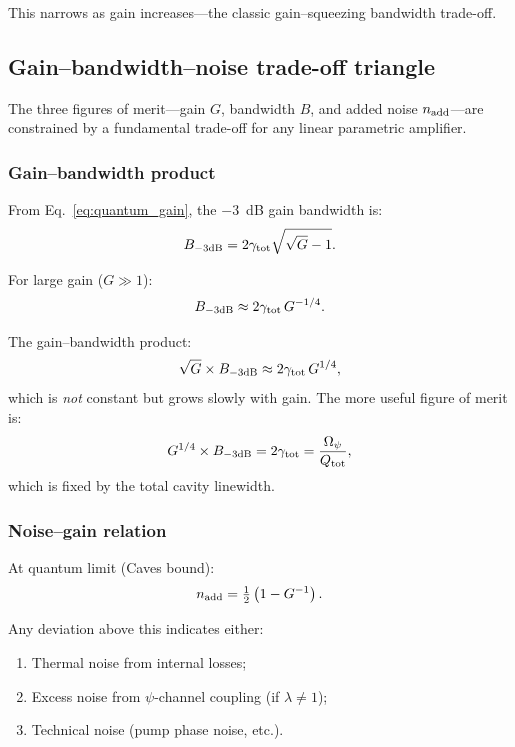 \documentclass[12pt,aps,prd,twocolumn,superscriptaddress,nofootinbib]{revtex4-2}
\newcommand{\Opsi}{\Omega_\psi}
\newcommand{\half}{\tfrac{1}{2}}
\begin{document}
This narrows as gain increases---the classic gain--squeezing
bandwidth trade-off.

\subsection{Gain--bandwidth--noise trade-off triangle}
\label{sec:triangle}

The three figures of merit---gain $G$, bandwidth $B$, and
added noise $n_{\rm add}$---are constrained by a fundamental
trade-off for any linear parametric amplifier.

\subsubsection{Gain--bandwidth product}

From Eq.~\eqref{eq:quantum_gain}, the $-3$~dB gain bandwidth is:
\begin{equation}
B_{-3{\rm dB}} = 2\gamma_{\rm tot}\sqrt{\sqrt{G}-1}.
\label{eq:gbw_exact}
\end{equation}

For large gain ($G \gg 1$):
\begin{equation}
B_{-3{\rm dB}} \approx 2\gamma_{\rm tot}\,G^{-1/4}.
\label{eq:gbw_approx}
\end{equation}

The gain--bandwidth product:
\begin{equation}
\sqrt{G}\times B_{-3{\rm dB}} \approx 2\gamma_{\rm tot}\,G^{1/4},
\label{eq:GBW}
\end{equation}
which is \emph{not} constant but grows slowly with gain.
The more useful figure of merit is:
\begin{equation}
G^{1/4}\times B_{-3{\rm dB}} = 2\gamma_{\rm tot}
= \frac{\Opsi}{Q_{\rm tot}},
\label{eq:GBW_const}
\end{equation}
which is fixed by the total cavity linewidth.

\subsubsection{Noise--gain relation}

At quantum limit (Caves bound):
\begin{equation}
n_{\rm add} = \half\left(1-G^{-1}\right).
\label{eq:noise_gain}
\end{equation}

Any deviation above this indicates either:
\begin{enumerate}[noitemsep]
\item Thermal noise from internal losses;
\item Excess noise from $\psi$-channel coupling (if $\lambda\neq1$);
\item Technical noise (pump phase noise, etc.).
\end{enumerate}
\end{document}
